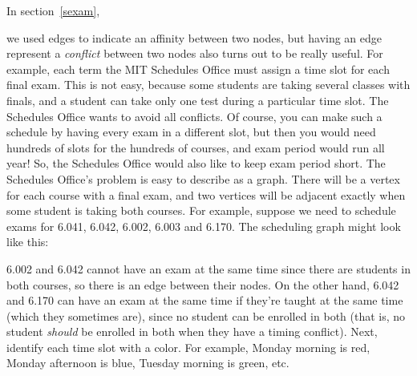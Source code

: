 \begin{problems}
\classproblems
{}

\homeworkproblems
{}
\end{problems}



In section~\ref{sexam},

we used edges to indicate an affinity between two nodes, but having an
edge represent a \emph{conflict} between two nodes also turns out to be
really useful.  For example, each term the MIT Schedules Office must
assign a time slot for each final exam.  This is not easy, because some
students are taking several classes with finals, and a student can take
only one test during a particular time slot.  The Schedules Office wants
to avoid all conflicts.  Of course, you can make such a schedule by having
every exam in a different slot, but then you would need hundreds of slots
for the hundreds of courses, and exam period would run all year!  So, the
Schedules Office would also like to keep exam period short.
The Schedules Office's problem is easy to describe as a graph.  There
will be a vertex for each course with a final exam, and two vertices will
be adjacent exactly when some student is taking both courses.  For
example, suppose we need to schedule exams for 6.041, 6.042, 6.002, 6.003
and 6.170.  The scheduling graph might look like this:


6.002 and 6.042 cannot have an exam at the same time since there are
students in both courses, so there is an edge between their nodes.  On the
other hand, 6.042 and 6.170 can have an exam at the same time if they're
taught at the same time (which they sometimes are), since no student can
be enrolled in both (that is, no student \emph{should} be enrolled in both
when they have a timing conflict).  Next, identify each time slot with a
color.  For example, Monday morning is red, Monday afternoon is blue,
Tuesday morning is green, etc.


